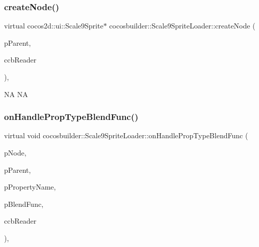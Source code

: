\subsubsection{\texorpdfstring{create\+Node()}{createNode()}\hspace{0.1cm}{\footnotesize\ttfamily [2/2]}}
{\footnotesize\ttfamily virtual cocos2d\+::ui\+::\+Scale9\+Sprite$\ast$ cocosbuilder\+::\+Scale9\+Sprite\+Loader\+::create\+Node (\begin{DoxyParamCaption}\item[{cocos2d\+::\+Node $\ast$}]{p\+Parent,  }\item[{\hyperlink{classcocosbuilder_1_1CCBReader}{cocosbuilder\+::\+C\+C\+B\+Reader} $\ast$}]{ccb\+Reader }\end{DoxyParamCaption})\hspace{0.3cm}{\ttfamily [protected]}, {\ttfamily [virtual]}}

NA  NA \mbox{\label{classcocosbuilder_1_1Scale9SpriteLoader_ae54855ef720914b44a394f1586ed3ca0}} 
\subsubsection{\texorpdfstring{on\+Handle\+Prop\+Type\+Blend\+Func()}{onHandlePropTypeBlendFunc()}\hspace{0.1cm}{\footnotesize\ttfamily [1/2]}}
{\footnotesize\ttfamily virtual void cocosbuilder\+::\+Scale9\+Sprite\+Loader\+::on\+Handle\+Prop\+Type\+Blend\+Func (\begin{DoxyParamCaption}\item[{cocos2d\+::\+Node $\ast$}]{p\+Node,  }\item[{cocos2d\+::\+Node $\ast$}]{p\+Parent,  }\item[{const char $\ast$}]{p\+Property\+Name,  }\item[{cocos2d\+::\+Blend\+Func}]{p\+Blend\+Func,  }\item[{\hyperlink{classcocosbuilder_1_1CCBReader}{C\+C\+B\+Reader} $\ast$}]{ccb\+Reader }\end{DoxyParamCaption})\hspace{0.3cm}{\ttfamily [protected]}, {\ttfamily [virtual]}}

